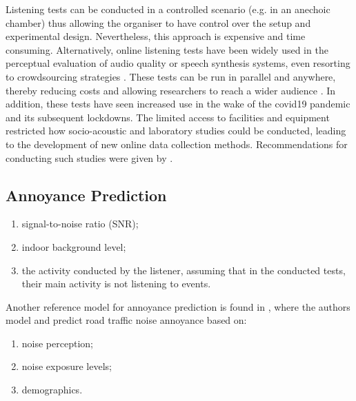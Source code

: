    Listening tests can be conducted in a controlled scenario (e.g. in an anechoic chamber) thus allowing the organiser to have control over the setup and experimental design. Nevertheless, this approach is expensive and time consuming. Alternatively, online listening tests have been widely used in the perceptual evaluation of audio quality or speech synthesis systems, even resorting to crowdsourcing strategies . These tests can be run in parallel and anywhere, thereby reducing costs and allowing researchers to reach a wider audience . In addition, these tests have seen increased use in the wake of the \gls{covid19} pandemic and its subsequent lockdowns. The limited access to facilities and equipment restricted how socio-acoustic and laboratory studies could be conducted, leading to the development of new online data collection methods. Recommendations for conducting such studies were given by . %

 \subsection{Annoyance Prediction}

   \begin{enumerate}
     \item signal-to-noise ratio (SNR);
     \item indoor background level;
     \item the activity conducted by the listener, assuming that in the conducted tests, their main activity is not listening to events.
   \end{enumerate}


   Another reference model for annoyance prediction is found in , where the authors model and predict road traffic noise annoyance based on:
   \begin{enumerate}
     \item noise perception;
     \item noise exposure levels;
     \item demographics.
   \end{enumerate}

